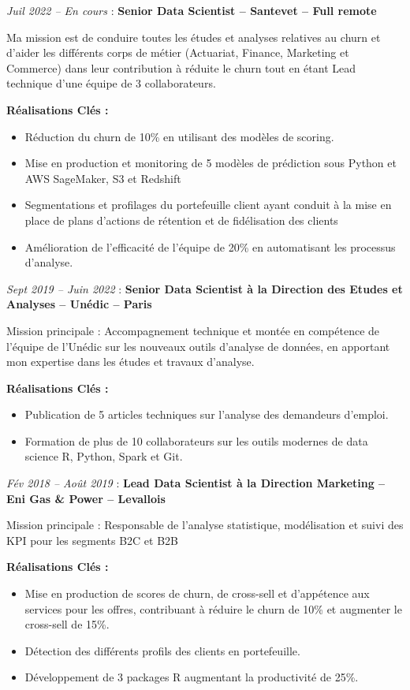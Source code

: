 \documentclass[
  letterpaper,
  DIV=11,
  numbers=noendperiod]{scrartcl}
\providecommand{\tightlist}{%
  \setlength{\itemsep}{0pt}\setlength{\parskip}{0pt}}\usepackage{longtable,booktabs,array}
\begin{document}
\emph{Juil 2022 -- En cours} : \textbf{Senior Data Scientist -- Santevet
-- Full remote}

Ma mission est de conduire toutes les études et analyses relatives au
churn et d'aider les différents corps de métier (Actuariat, Finance,
Marketing et Commerce) dans leur contribution à réduite le churn tout en
étant Lead technique d'une équipe de 3 collaborateurs.

\textbf{Réalisations Clés :}

\begin{itemize}
\tightlist
\item
  Réduction du churn de 10\% en utilisant des modèles de scoring.
\item
  Mise en production et monitoring de 5 modèles de prédiction sous
  Python et AWS SageMaker, S3 et Redshift
\item
  Segmentations et profilages du portefeuille client ayant conduit à la
  mise en place de plans d'actions de rétention et de fidélisation des
  clients
\item
  Amélioration de l'efficacité de l'équipe de 20\% en automatisant les
  processus d'analyse.
\end{itemize}

\emph{Sept 2019 -- Juin 2022} : \textbf{Senior Data Scientist à la
Direction des Etudes et Analyses -- Unédic -- Paris}

Mission principale : Accompagnement technique et montée en compétence de
l'équipe de l'Unédic sur les nouveaux outils d'analyse de données, en
apportant mon expertise dans les études et travaux d'analyse.

\textbf{Réalisations Clés :}

\begin{itemize}
\tightlist
\item
  Publication de 5 articles techniques sur l'analyse des demandeurs
  d'emploi.
\item
  Formation de plus de 10 collaborateurs sur les outils modernes de data
  science R, Python, Spark et Git.
\end{itemize}

\emph{Fév 2018 -- Août 2019} : \textbf{Lead Data Scientist à la
Direction Marketing -- Eni Gas \& Power -- Levallois}

Mission principale : Responsable de l'analyse statistique, modélisation
et suivi des KPI pour les segments B2C et B2B

\textbf{Réalisations Clés :}

\begin{itemize}
\tightlist
\item
  Mise en production de scores de churn, de cross-sell et d'appétence
  aux services pour les offres, contribuant à réduire le churn de 10\%
  et augmenter le cross-sell de 15\%.
\item
  Détection des différents profils des clients en portefeuille.
\item
  Développement de 3 packages R augmentant la productivité de 25\%.
\end{itemize}
\end{document}
